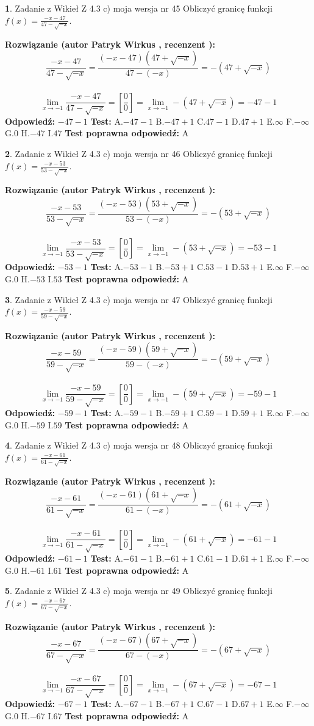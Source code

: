 \documentclass[12pt, a4paper]{article}
\theoremstyle{definition} %
\newtheorem{zad}{}
\newcommand{\zadStart}[1]{\begin{zad}#1\newline}
\newcommand{\zadStop}{\end{zad}}
\newcommand{\rozwStart}[2]{\noindent \textbf{Rozwiązanie (autor #1 , recenzent #2): }\newline}
\newcommand{\rozwStop}{\newline}
\newcommand{\odpStart}{\noindent \textbf{Odpowiedź:}\newline}
\newcommand{\odpStop}{\newline}
\newcommand{\testStart}{\noindent \textbf{Test:}\newline}
\newcommand{\testStop}{\newline}
\newcommand{\kluczStart}{\noindent \textbf{Test poprawna odpowiedź:}\newline}
\newcommand{\kluczStop}{\newline}
\begin{document}
\zadStart{Zadanie z Wikieł Z 4.3 c) moja wersja nr 45}
Obliczyć granicę funkcji $f(x)=\frac{-x-47}{47-\sqrt{-x}}$.
\zadStop
\rozwStart{Patryk Wirkus}{}
$$\frac{-x-47}{47-\sqrt{-x}}=\frac{(-x-47)(47+\sqrt{-x})}{47-(-x)}=-(47+\sqrt{-x})$$
\\
$$\lim\limits_{x\to-1}\frac{-x-47}{47-\sqrt{-x}}=[\frac{0}{0}]=\lim\limits_{x\to-1}-(47+\sqrt{-x}) =-47-1$$
\rozwStop
\odpStart
$-47-1$
\odpStop
\testStart
A.$-47-1$
B.$-47+1$
C.$47-1$
D.$47+1$
E.$\infty$
F.$-\infty$
G.$0$
H.$-47$
I.$47$
\testStop
\kluczStart
A
\kluczStop



\zadStart{Zadanie z Wikieł Z 4.3 c) moja wersja nr 46}
Obliczyć granicę funkcji $f(x)=\frac{-x-53}{53-\sqrt{-x}}$.
\zadStop
\rozwStart{Patryk Wirkus}{}
$$\frac{-x-53}{53-\sqrt{-x}}=\frac{(-x-53)(53+\sqrt{-x})}{53-(-x)}=-(53+\sqrt{-x})$$
\\
$$\lim\limits_{x\to-1}\frac{-x-53}{53-\sqrt{-x}}=[\frac{0}{0}]=\lim\limits_{x\to-1}-(53+\sqrt{-x}) =-53-1$$
\rozwStop
\odpStart
$-53-1$
\odpStop
\testStart
A.$-53-1$
B.$-53+1$
C.$53-1$
D.$53+1$
E.$\infty$
F.$-\infty$
G.$0$
H.$-53$
I.$53$
\testStop
\kluczStart
A
\kluczStop



\zadStart{Zadanie z Wikieł Z 4.3 c) moja wersja nr 47}
Obliczyć granicę funkcji $f(x)=\frac{-x-59}{59-\sqrt{-x}}$.
\zadStop
\rozwStart{Patryk Wirkus}{}
$$\frac{-x-59}{59-\sqrt{-x}}=\frac{(-x-59)(59+\sqrt{-x})}{59-(-x)}=-(59+\sqrt{-x})$$
\\
$$\lim\limits_{x\to-1}\frac{-x-59}{59-\sqrt{-x}}=[\frac{0}{0}]=\lim\limits_{x\to-1}-(59+\sqrt{-x}) =-59-1$$
\rozwStop
\odpStart
$-59-1$
\odpStop
\testStart
A.$-59-1$
B.$-59+1$
C.$59-1$
D.$59+1$
E.$\infty$
F.$-\infty$
G.$0$
H.$-59$
I.$59$
\testStop
\kluczStart
A
\kluczStop



\zadStart{Zadanie z Wikieł Z 4.3 c) moja wersja nr 48}
Obliczyć granicę funkcji $f(x)=\frac{-x-61}{61-\sqrt{-x}}$.
\zadStop
\rozwStart{Patryk Wirkus}{}
$$\frac{-x-61}{61-\sqrt{-x}}=\frac{(-x-61)(61+\sqrt{-x})}{61-(-x)}=-(61+\sqrt{-x})$$
\\
$$\lim\limits_{x\to-1}\frac{-x-61}{61-\sqrt{-x}}=[\frac{0}{0}]=\lim\limits_{x\to-1}-(61+\sqrt{-x}) =-61-1$$
\rozwStop
\odpStart
$-61-1$
\odpStop
\testStart
A.$-61-1$
B.$-61+1$
C.$61-1$
D.$61+1$
E.$\infty$
F.$-\infty$
G.$0$
H.$-61$
I.$61$
\testStop
\kluczStart
A
\kluczStop



\zadStart{Zadanie z Wikieł Z 4.3 c) moja wersja nr 49}
Obliczyć granicę funkcji $f(x)=\frac{-x-67}{67-\sqrt{-x}}$.
\zadStop
\rozwStart{Patryk Wirkus}{}
$$\frac{-x-67}{67-\sqrt{-x}}=\frac{(-x-67)(67+\sqrt{-x})}{67-(-x)}=-(67+\sqrt{-x})$$
\\
$$\lim\limits_{x\to-1}\frac{-x-67}{67-\sqrt{-x}}=[\frac{0}{0}]=\lim\limits_{x\to-1}-(67+\sqrt{-x}) =-67-1$$
\rozwStop
\odpStart
$-67-1$
\odpStop
\testStart
A.$-67-1$
B.$-67+1$
C.$67-1$
D.$67+1$
E.$\infty$
F.$-\infty$
G.$0$
H.$-67$
I.$67$
\testStop
\kluczStart
A
\kluczStop
\end{document}
